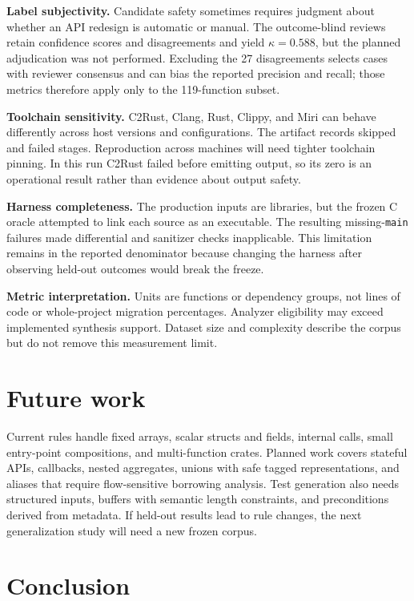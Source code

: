 \documentclass[conference]{IEEEtran}
\begin{document}
\textbf{Label subjectivity.} Candidate safety sometimes requires judgment
about whether an API redesign is automatic or manual. The outcome-blind reviews
retain confidence scores and disagreements and yield $\kappa=0.588$, but the
planned adjudication was not performed. Excluding the 27 disagreements selects
cases with reviewer consensus and can bias the reported precision and recall;
those metrics therefore apply only to the 119-function subset.

\textbf{Toolchain sensitivity.} C2Rust, Clang, Rust, Clippy, and Miri can
behave differently across host versions and configurations. The artifact
records skipped and failed stages. Reproduction across machines will need
tighter toolchain pinning. In this run C2Rust failed before emitting output, so
its zero is an operational result rather than evidence about output safety.

\textbf{Harness completeness.} The production inputs are libraries, but the
frozen C oracle attempted to link each source as an executable. The resulting
missing-\texttt{main} failures made differential and sanitizer checks
inapplicable. This limitation remains in the reported denominator because
changing the harness after observing held-out outcomes would break the freeze.

\textbf{Metric interpretation.} Units are functions or dependency groups, not
lines of code or whole-project migration percentages. Analyzer eligibility may
exceed implemented synthesis support. Dataset size and complexity describe the
corpus but do not remove this measurement limit.

\section{Future work}

Current rules handle fixed arrays, scalar structs and fields, internal calls,
small entry-point compositions, and multi-function crates. Planned work covers
stateful APIs, callbacks, nested aggregates, unions with safe tagged
representations, and aliases that require flow-sensitive borrowing analysis.
Test generation also needs structured inputs, buffers with semantic length
constraints, and preconditions derived from metadata. If held-out results lead
to rule changes, the next generalization study will need a new frozen corpus.

\section{Conclusion}
\end{document}
